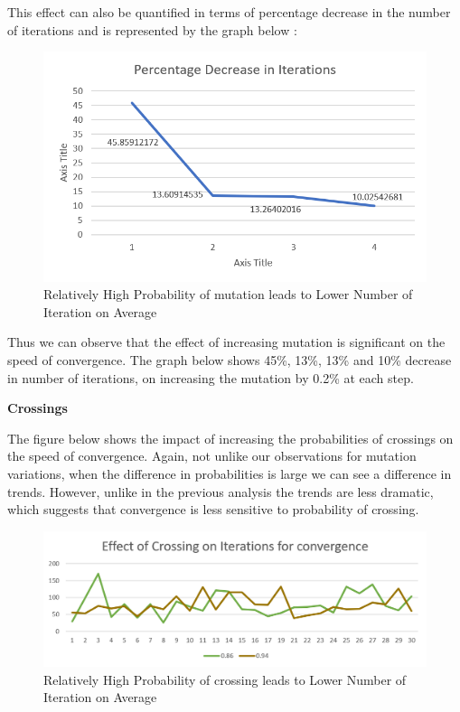 \documentclass[twoside,twocolumn]{article}
\begin{document}
This effect can also be quantified in terms of percentage decrease in the number of iterations and is represented by the graph below :

\vspace{-4mm}
\begin{figure}[h]
\centering
\includegraphics[height=6 cm\textwidth]{images/mutationsperdec.png}
\caption{Relatively High Probability of mutation leads to Lower Number of Iteration on Average}
\end{figure}

Thus we can observe that the effect of increasing mutation is significant on the speed of convergence.
The graph below shows 45\%, 13\%, 13\% and 10\%  decrease in number of iterations, on increasing the mutation by 0.2\% at each step.

\textbf{Crossings}


The figure below shows the impact of increasing the probabilities of crossings on the speed of convergence. Again, not unlike our observations for mutation variations, when the difference in probabilities is large we can see a difference in trends. However, unlike in the previous analysis the trends are less dramatic, which suggests that convergence is less sensitive to probability of crossing. 

\vspace{-4mm}
\begin{figure}[h]
\centering
\includegraphics[height=3.5 cm\textwidth]{images/crossingComparisons.png}
\caption{Relatively High Probability of crossing leads to Lower Number of Iteration on Average}
\end{figure}
\end{document}
